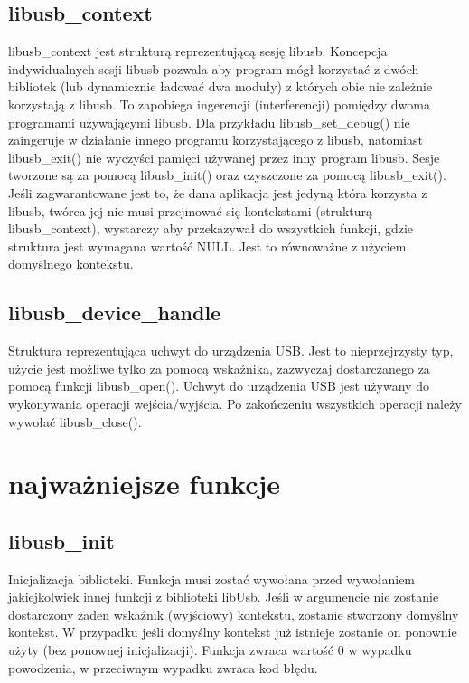 \documentclass{BscUS}
\begin{document}
\subsection{libusb\_context}
libusb\_context jest strukturą reprezentującą sesję libusb.
\newline
Koncepcja indywidualnych sesji libusb pozwala aby program mógł korzystać z dwóch bibliotek (lub dynamicznie ładować dwa moduły) z których obie nie zależnie korzystają z libusb. To zapobiega ingerencji (interferencji) pomiędzy dwoma programami używającymi libusb. Dla przykładu libusb\_set\_debug() nie zaingeruje w działanie innego programu korzystającego z libusb, natomiast libusb\_exit() nie wyczyści pamięci używanej przez inny program libusb.
\newline
Sesje tworzone są za pomocą libusb\_init() oraz czyszczone za pomocą libusb\_exit(). Jeśli zagwarantowane jest to, że dana aplikacja jest jedyną która korzysta z libusb, twórca jej nie musi przejmować się kontekstami (strukturą libusb\_context), wystarczy aby przekazywał do wszystkich funkcji, gdzie struktura jest wymagana wartość NULL. Jest to równoważne z użyciem domyślnego kontekstu.

\subsection{libusb\_device\_handle}
Struktura reprezentująca uchwyt do urządzenia USB.
\newline
Jest to nieprzejrzysty typ, użycie jest możliwe tylko za pomocą wskaźnika, zazwyczaj dostarczanego za pomocą funkcji libusb\_open().
\newline
Uchwyt do urządzenia USB jest używany do wykonywania operacji wejścia/wyjścia. Po zakończeniu wszystkich operacji należy wywołać libusb\_close().

\section{najważniejsze funkcje}
\subsection{libusb\_init}
Inicjalizacja biblioteki.
\newline
Funkcja musi zostać wywołana przed wywołaniem jakiejkolwiek innej funkcji z biblioteki libUsb.
\newline
Jeśli w argumencie nie zostanie dostarczony żaden wskaźnik (wyjściowy) kontekstu, zostanie stworzony domyślny kontekst. W przypadku jeśli domyślny kontekst już istnieje zostanie on ponownie użyty (bez ponownej inicjalizacji).
\newline
Funkcja zwraca wartość 0 w wypadku powodzenia, w przeciwnym wypadku zwraca kod błędu.
\end{document}
